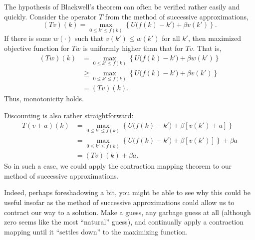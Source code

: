 \documentclass[12pt]{article}
\theoremstyle{definition}
\begin{document}
The hypothesis of Blackwell's theorem can often be verified rather easily and quickly. Consider the operator $T$ from the method of successive approximations,
	\[	(Tv)(k) = \max_{0 \leq k' \leq f(k)} \left\{ U\big( f(k) - k' \big) + \beta v(k')\right\}.\]	
	If there is some $w(\cdot)$ such that $v(k') \leq w(k')$ for all $k'$, then maximized objective function for $Tw$ is uniformly higher than that for $Tv$. That is, 
\begin{align*}
	(Tw)(k) &= \max_{0 \leq k' \leq f(k)} \left\{ U\big( f(k) - k' \big) + \beta w(k')\right\} \\
		&\geq \max_{0 \leq k' \leq f(k)} \left\{ U\big( f(k) - k' \big) + \beta v(k')\right\} \\
		&= (Tv)(k).
\end{align*}
Thus, monotonicity holds.

Discounting is also rather straightforward:
\begin{align*}
	T(v+a)(k) &= \max_{0 \leq k' \leq f(k)} \left\{ U\big( f(k) - k' \big) + \beta [v(k') + a]\right\} \\
		&= \max_{0 \leq k' \leq f(k)} \left\{ U\big( f(k) - k' \big) + \beta [v(k')]\right\} + \beta a\\
		&= (Tv)(k) + \beta a.
\end{align*}
So in such a case, we could apply the contraction mapping theorem to our method of successive approximations.

Indeed, perhaps foreshadowing a bit, you might be able to see why this could be useful insofar as the method of successive approximations could allow us to contract our way to a solution. Make a guess, any garbage guess at all (although zero seems like the most ``natural'' guess), and continually apply a contraction mapping until it ``settles down'' to the maximizing function. 

	
\end{document}
